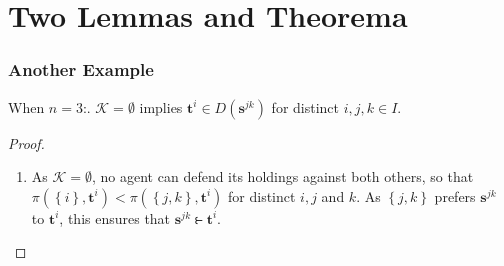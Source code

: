 \documentclass{beamer}
\makeatletter
\def\mcolor#1#2{\rule{0ex}{0ex}\color{#1}#2\color{black}{}}
\def\Quant#1#2{\begin{array}[t]{@{}c@{}}#1 \\[-1ex] \scriptstyle #2 \end{array}\;}
\def\ForAll#1{\Quant{\forall}{#1}}
\newenvironment{flist}{\begin{array}{@{}ll@{}}}{\end{array}}
\newenvironment{Envanywithlong}[4]{\vspace{0.3ex}\par\noindent \textbf{#1}[``#2'', any[$#3$], \\
  \makebox[3mm]{}with[$#4$], \\[0.5ex]\makebox[5mm]{}
  \begin{math}\begin{flist}}{\end{flist}]%
  \end{math}\vspace{0.3ex}\rmfamily}
\makeatother
\begin{document}
\section{Two Lemmas and Theorema}


\begin{frame}
\frametitle{Another Example}
\begin{lemma}
  When $n = 3$:. $\mathcal{K} = \emptyset$ implies $\bm{t}^i \in D \left( \bm{s}^{jk} \right)$\quad
  for distinct $i, j, k \in I$.
\end{lemma}
\begin{proof}
  \begin{enumerate}
  \item As $\mathcal{K} = \emptyset$, no agent can defend its holdings
    against both others, so that $\pi \left( \left\{ i \right\},
      \bm{t}^i \right) < \pi \left( \left\{ j, k \right\}, \bm{t}^i
    \right)$ for distinct $i, j$ and $k$.  As $\left\{ j, k \right\}$
    prefers $\bm{s}^{jk}$ to $\bm{t}^i$, this ensures that
    $\bm{s}^{jk} \strictfi \bm{t}^i$.
  \end{enumerate}
\end{proof}
\end{frame}
\end{document}
